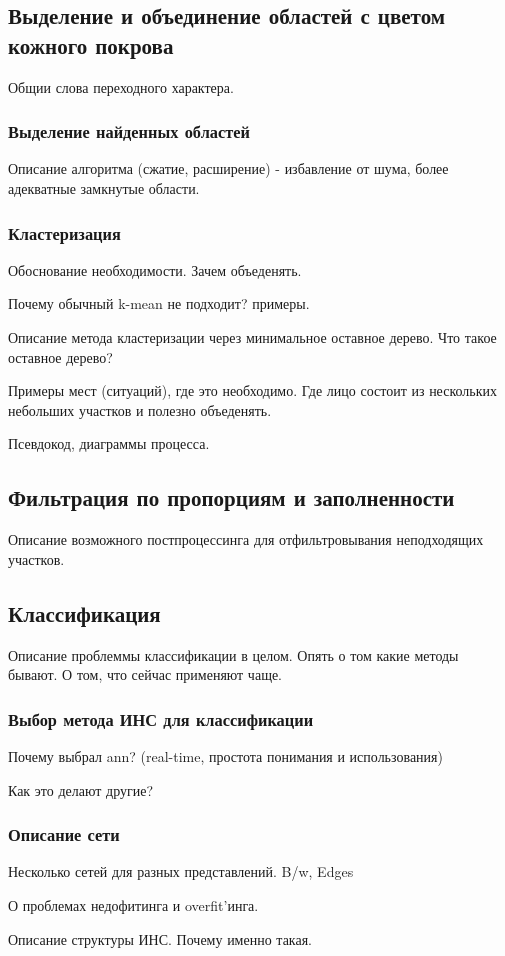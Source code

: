 \documentclass[12pt]{report}
\begin{document}
\subsection{Выделение и объединение областей с цветом кожного покрова}
Общии слова переходного характера. 
\subsubsection{Выделение найденных областей}
Описание алгоритма (сжатие, расширение) -  избавление от шума, более адекватные замкнутые области.
\subsubsection{Кластеризация}
Обоснование необходимости. Зачем объеденять.	

Почему обычный k-mean не подходит? примеры.

Описание метода кластеризации через минимальное оставное дерево. Что такое оставное дерево?

Примеры мест (ситуаций), где это необходимо. Где лицо состоит из нескольких небольших участков и полезно объеденять.

Псевдокод, диаграммы процесса.
\subsection{Фильтрация по пропорциям и заполненности}
Описание возможного постпроцессинга для отфильтровывания неподходящих участков.
\subsection{Классификация}
Описание проблеммы классификации в целом.
Опять о том какие методы бывают. О том, что сейчас применяют чаще.
\subsubsection{Выбор метода ИНС для классификации}
Почему выбрал ann? (real-time, простота понимания и использования)

Как это делают другие?
\subsubsection{Описание сети}
Несколько сетей для разных представлений. B/w, Edges

О проблемах недофитинга и overfit'инга.

Описание структуры ИНС. Почему именно такая.
\end{document}
